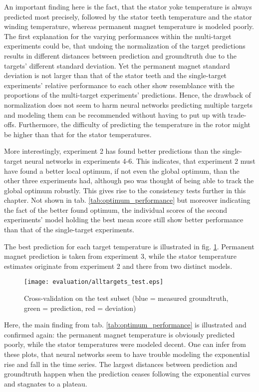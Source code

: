 An important finding here is the fact, that the stator yoke temperature is always predicted most precisely, followed by the stator teeth temperature and the stator winding temperature, whereas permanent magnet temperature is modeled poorly.
The first explanation for the varying performances within the multi-target experiments could be, that undoing the normalization of the target predictions results in different distances between prediction and groundtruth due to the targets' different standard deviation.
Yet the permanent magnet standard deviation is not larger than that of the stator teeth and the single-target experiments' relative performance to each other show resemblance with the proportions of the multi-target experiments' predictions.
Hence, the drawback of normalization does not seem to harm neural networks predicting multiple targets and modeling them can be recommended without having to put up with trade-offs.
Furthermore, the difficulty of predicting the temperature in the rotor might be higher than that for the stator temperatures.

More interestingly, experiment 2 has found better predictions than the single-target neural networks in experiments 4-6.
This indicates, that experiment 2 must have found a better local optimum, if not even the global optimum, than the other three experiments had, although \gls{pso} was thought of being able to track the global optimum robustly.
This gives rise to the consistency tests further in this chapter.
Not shown in tab. \ref{tab:optimum_performance} but moreover indicating the fact of the better found optimum, the individual scores of the second experiments' model holding the best mean score still show better performance than that of the single-target experiments.  

The best prediction for each target temperature is illustrated in fig. \ref{fig:best_predictions}.
Permanent magnet prediction is taken from experiment 3, while the stator temperature estimates originate from experiment 2 and there from two distinct models.

\begin{figure}[!htb]
	\centering
	\texttt{[image: evaluation/alltargets\_test.eps]}
	
	\caption{Cross-validation on the test subset (blue = measured groundtruth, green = prediction, red = deviation)}
	\label{fig:best_predictions}
\end{figure}

Here, the main finding from tab. \ref{tab:optimum_performance} is illustrated and confirmed again:
the permanent magnet temperature is obviously predicted poorly, while the stator temperatures were modeled decent.
One can infer from these plots, that neural networks seem to have trouble modeling the exponential rise and fall in the time series.
The largest distances between prediction and groundtruth happen when the prediction ceases following the exponential curves and stagnates to a plateau.

